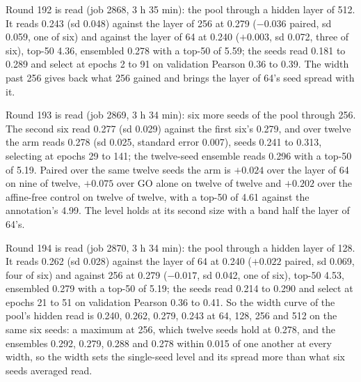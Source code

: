 Round 192 is read (job 2868, 3 h 35 min): the pool through a hidden layer of 512. It
reads 0.243 (sd 0.048) against the layer of 256 at 0.279 ($-0.036$ paired, sd 0.059,
one of six) and against the layer of 64 at 0.240 ($+0.003$, sd 0.072, three of six),
top-50 4.36, ensembled 0.278 with a top-50 of 5.59; the seeds read 0.181 to 0.289 and
select at epochs 2 to 91 on validation Pearson 0.36 to 0.39. The width past 256 gives
back what 256 gained and brings the layer of 64's seed spread with it.

Round 193 is read (job 2869, 3 h 34 min): six more seeds of the pool through 256. The
second six read 0.277 (sd 0.029) against the first six's 0.279, and over twelve the arm
reads 0.278 (sd 0.025, standard error 0.007), seeds 0.241 to 0.313, selecting at
epochs 29 to 141; the twelve-seed ensemble reads 0.296 with a top-50 of 5.19. Paired
over the same twelve seeds the arm is $+0.024$ over the layer of 64 on nine of twelve,
$+0.075$ over GO alone on twelve of twelve and $+0.202$ over the affine-free control on
twelve of twelve, with a top-50 of 4.61 against the annotation's 4.99. The level holds
at its second size with a band half the layer of 64's.

Round 194 is read (job 2870, 3 h 34 min): the pool through a hidden layer of 128. It
reads 0.262 (sd 0.028) against the layer of 64 at 0.240 ($+0.022$ paired, sd 0.069,
four of six) and against 256 at 0.279 ($-0.017$, sd 0.042, one of six), top-50 4.53,
ensembled 0.279 with a top-50 of 5.19; the seeds read 0.214 to 0.290 and select at
epochs 21 to 51 on validation Pearson 0.36 to 0.41. So the width curve of the pool's
hidden read is 0.240, 0.262, 0.279, 0.243 at 64, 128, 256 and 512 on the same six
seeds: a maximum at 256, which twelve seeds hold at 0.278, and the ensembles 0.292,
0.279, 0.288 and 0.278 within 0.015 of one another at every width, so the width sets
the single-seed level and its spread more than what six seeds averaged read.

